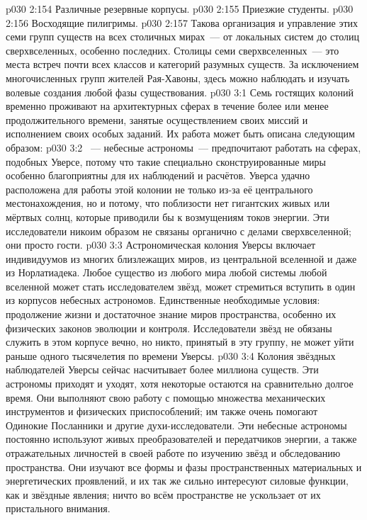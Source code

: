 \vs p030 2:154 Различные резервные корпусы.
\vs p030 2:155 Приезжие студенты.
\vs p030 2:156 Восходящие пилигримы.
\vs p030 2:157 \pc Такова организация и управление этих семи групп существ на всех столичных мирах~--- от локальных систем до столиц сверхвселенных, особенно последних. Столицы семи сверхвселенных~--- это места встреч почти всех классов и категорий разумных существ. За исключением многочисленных групп жителей Рая\hyp{}Хавоны, здесь можно наблюдать и изучать волевые создания любой фазы существования.
\vs p030 3:1 Семь гостящих колоний временно проживают на архитектурных сферах в течение более или менее продолжительного времени, занятые осуществлением своих миссий и исполнением своих особых заданий. Их работа может быть описана следующим образом:
\vs p030 3:2 ~--- небесные астрономы~--- предпочитают работать на сферах, подобных Уверсе, потому что такие специально сконструированные миры особенно благоприятны для их наблюдений и расчётов. Уверса удачно расположена для работы этой колонии не только из\hyp{}за её центрального местонахождения, но и потому, что поблизости нет гигантских живых или мёртвых солнц, которые приводили бы к возмущениям токов энергии. Эти исследователи никоим образом не связаны органично с делами сверхвселенной; они просто гости.
\vs p030 3:3 Астрономическая колония Уверсы включает индивидуумов из многих близлежащих миров, из центральной вселенной и даже из Норлатиадека. Любое существо из любого мира любой системы любой вселенной может стать исследователем звёзд, может стремиться вступить в один из корпусов небесных астрономов. Единственные необходимые условия: продолжение жизни и достаточное знание миров пространства, особенно их физических законов эволюции и контроля. Исследователи звёзд не обязаны служить в этом корпусе вечно, но никто, принятый в эту группу, не может уйти раньше одного тысячелетия по времени  Уверсы.
\vs p030 3:4 Колония звёздных наблюдателей Уверсы сейчас насчитывает более миллиона существ. Эти астрономы приходят и уходят, хотя некоторые остаются на сравнительно долгое время. Они выполняют свою работу с помощью множества механических инструментов и физических приспособлений; им также очень помогают Одинокие Посланники и другие духи\hyp{}исследователи. Эти небесные астрономы постоянно используют живых преобразователей и передатчиков энергии, а также отражательных личностей в своей работе по изучению звёзд и обследованию пространства. Они изучают все формы и фазы пространственных материальных и энергетических проявлений, и их так же сильно интересуют силовые функции, как и звёздные явления; ничто во всём пространстве не ускользает от их пристального внимания.
